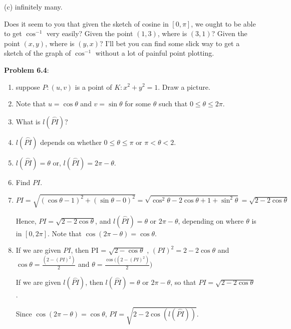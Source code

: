 \documentclass[english]{book}
\newcommand{\arc}[1]{\overset{\frown}{#1} }
\begin{document}
(c) infinitely many.

\vspace{0.3cm}

Does it seem to you that given the sketch of cosine in $[0,\pi]$, we ought to be able to get $\cos^{-1}$ very easily? Given the point $(1,3)$, where is $(3,1)$? Given the point $(x,y)$, where is $(y,x)$? I'll bet you can find some slick way to get a sketch of the graph of $\cos^{-1}$ without a lot of painful point plotting.

\vspace{0.3cm}

\textbf{Problem 6.4}:
\begin{enumerate}[\hspace{1cm}1)]
  \item suppose $P:(u,v)$ is a point of $K:x^{2}+y^{2} = 1$. Draw a picture.
  \item Note that $u = \cos \theta$ and $v = \sin \theta$ for some $\theta$ such that $0 \leq \theta \leq 2\pi$.
  \item What is $l(\arc{PI})$?
  \item $l(\arc{PI})$ depends on whether $0 \leq \theta \leq \pi$ or $\pi < \theta < 2$.
  \item $l(\arc{PI}) = \theta$ or, $l(\arc{PI}) = 2\pi - \theta$.
  \item Find $PI$.
  \item $PI = \sqrt{(\cos \theta - 1)^{2}+(\sin \theta - 0)^{2}} = \sqrt{\cos^{2} \theta - 2 \cos \theta + 1 + \sin^{2} \theta} = \sqrt{2 - 2 \cos \theta}$

        Hence, $PI = \sqrt{2 - 2 \cos \theta}$, and $l(\arc{PI}) = \theta$ or $2\pi - \theta$, depending on where $\theta$ is in $[0,2\pi]$. Note that $\cos(2\pi - \theta) = \cos \theta$.

  \item If we are given $PI$, then PI = $\sqrt{2 - \cos\theta}$ , $(PI)^{2} = 2 -2 \cos \theta$ and $\cos \theta = \frac{ (2-(PI)^{2}) }{2}$ and $\theta = \frac{ \cos((2-(PI)^{2}) }{2})$

        If we are given $l(\arc{PI})$, then $l(\arc{PI}) = \theta$ or $2\pi - \theta$, so that $PI = \sqrt{2 - 2 \cos \theta}$.

        Since $\cos (2\pi - \theta) = \cos \theta$, $PI = \sqrt{2 - 2 \cos (l(\arc{PI}))}$.
\end{enumerate}
\end{document}

